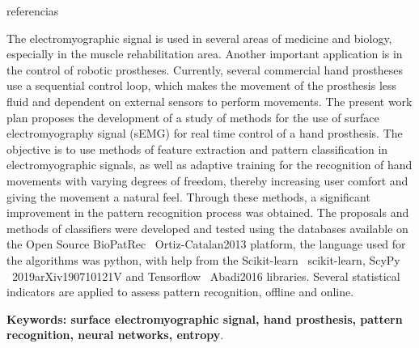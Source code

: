 \documentclass[a4paper, 12pt]{ppgeb}
\begin{document}
{\let\clearpage\relax
{referencias}{}
}
\acresetall %
\clearpage
\restoregeometry
\acresetall %
\vspace{24pt}

The electromyographic signal is used in several areas of medicine and biology, especially in the muscle rehabilitation area. Another important application is in the control of robotic prostheses. Currently, several commercial hand prostheses use a sequential control loop, which makes the movement of the prosthesis less fluid and dependent on external sensors to perform movements. The present work plan proposes the development of a study of methods for the use of surface electromyography signal (sEMG) for real time control of a hand prosthesis. The objective is to use methods of feature extraction and pattern classification in electromyographic signals, as well as adaptive training for the recognition of hand movements with varying degrees of freedom, thereby increasing user comfort and giving the movement a natural feel. Through these methods, a significant improvement in the pattern recognition process was obtained. The proposals and methods of classifiers were developed and tested using the databases available on the Open Source BioPatRec ~\cite{mainreferences}{Ortiz-Catalan2013} platform, the language used for the algorithms was python, with help from the Scikit-learn ~\cite{mainreferences}{scikit-learn}, ScyPy ~\cite{mainreferences}{2019arXiv190710121V} and Tensorflow ~\cite{mainreferences}{Abadi2016} libraries. Several statistical indicators are applied to assess pattern recognition, offline and online.

\vspace{14pt}

\noindent\textbf{Keywords: surface electromyographic signal, hand prosthesis, pattern recognition, neural networks, entropy}.


\acresetall %

\indice

\begin{center}
    {\bfseries{}}
\end{center}
\end{document}
